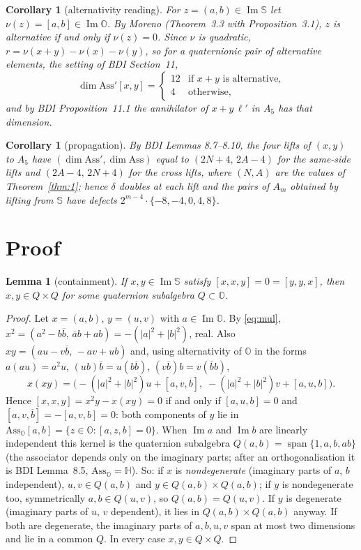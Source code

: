 \documentclass{baustms}
\theoremstyle{cupthm}
\newtheorem{cor}[thm]{Corollary}
\newtheorem{lemma}[thm]{Lemma}
\numberwithin{equation}{section}
\newcommand{\Ass}{\mathrm{Ass}}
\newcommand{\HH}{\mathbb{H}}
\newcommand{\OO}{\mathbb{O}}
\newcommand{\Sed}{\mathbb{S}}
\newcommand{\Imm}{\operatorname{Im}}
\begin{document}
\begin{cor}[alternativity reading]\label{cor:3}
For $z=(a,b)\in\Imm\Sed$ let $\nu(z)=[a,b]\in\Imm\OO$. By Moreno \cite{moreno} (Theorem~3.3 with Proposition~3.1), $z$ is alternative if and only if $\nu(z)=0$. Since $\nu$ is quadratic, $r=\nu(x+y)-\nu(x)-\nu(y)$, so for a quaternionic pair of alternative elements, the setting of BDI Section~11,
\[
\dim\Ass'[x,y]=\begin{cases}12& \text{if $x+y$ is alternative,}\\ 4& \text{otherwise,}\end{cases}
\]
and by BDI Proposition~11.1 the annihilator of $x+y\,\ell'$ in $A_5$ has that dimension.
\end{cor}

\begin{cor}[propagation]\label{cor:4}
By BDI Lemmas 8.7--8.10, the four lifts of $(x,y)$ to $A_5$ have $(\dim\Ass',\dim\Ass)$ equal to $(2N+4,\,2A-4)$ for the same-side lifts and $(2A-4,\,2N+4)$ for the cross lifts, where $(N,A)$ are the values of Theorem~\ref{thm:1}; hence $\delta$ doubles at each lift and the pairs of $A_m$ obtained by lifting from $\Sed$ have defects $2^{m-4}\cdot\{-8,-4,0,4,8\}$.
\end{cor}

\section{Proof}

\begin{lemma}[containment]\label{lem:A}
If $x,y\in\Imm\Sed$ satisfy $[x,x,y]=0=[y,y,x]$, then $x,y\in Q\times Q$ for some quaternion subalgebra $Q\subset\OO$.
\end{lemma}

\begin{proof}
Let $x=(a,b)$, $y=(u,v)$ with $a\in\Imm\OO$. By \eqref{eq:mul}, $x^2=(a^2-b\overline{b},\,\overline{a}b+ab)=-(|a|^2+|b|^2)$, real. Also $xy=(au-v\overline{b},\,-av+ub)$ and, using alternativity of $\OO$ in the forms $a(au)=a^2 u$, $(ub)\overline{b}=u(b\overline{b})$, $(v\overline{b})b=v(\overline{b}b)$,
\[
x(xy)=\bigl(-(|a|^2+|b|^2)u+[a,v,\overline{b}],\; -(|a|^2+|b|^2)v+[a,u,b]\bigr).
\]
Hence $[x,x,y]=x^2 y-x(xy)=0$ if and only if $[a,u,b]=0$ and $[a,v,\overline{b}]=-[a,v,b]=0$: both components of $y$ lie in $\Ass_{\OO}[a,b]=\{z\in\OO:[a,z,b]=0\}$. When $\Imm a$ and $\Imm b$ are linearly independent this kernel is the quaternion subalgebra $Q(a,b)=\operatorname{span}\{1,a,b,ab\}$ (the associator depends only on the imaginary parts; after an orthogonalisation it is BDI Lemma~8.5, $\Ass_{\OO}=\HH$). So: if $x$ is \emph{nondegenerate} (imaginary parts of $a$, $b$ independent), $u,v\in Q(a,b)$ and $y\in Q(a,b)\times Q(a,b)$; if $y$ is nondegenerate too, symmetrically $a,b\in Q(u,v)$, so $Q(a,b)=Q(u,v)$. If $y$ is degenerate (imaginary parts of $u$, $v$ dependent), it lies in $Q(a,b)\times Q(a,b)$ anyway. If both are degenerate, the imaginary parts of $a,b,u,v$ span at most two dimensions and lie in a common $Q$. In every case $x,y\in Q\times Q$.
\end{proof}
\end{document}
